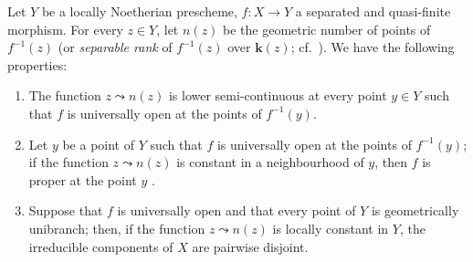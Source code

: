 \begin{proposition}[15.5.1]
\label{IV.15.5.1}
Let $Y$ be a locally Noetherian prescheme, $f:X\to Y$ a separated and quasi-finite morphism.
For every $z\in Y$, let $n(z)$ be the geometric number of points of $f^{-1}(z)$ \textup{(or} \emph{separable rank} \textup{of} $f^{-1}(z)$ \textup{over} $\boldsymbol{k}(z)$\textup{; cf.}\ \textup{)}.
We have the following properties:
\begin{enumerate}[label=(\roman*)]
  \item The function $z\leadsto n(z)$ is lower semi-continuous at every point $y\in Y$ such that $f$ is universally open at the points of $f^{-1}(y)$.
  \item Let $y$ be a point of $Y$ such that $f$ is universally open at the points of $f^{-1}(y)$; if the function $z\leadsto n(z)$ is constant in a neighbourhood of $y$, then $f$ is proper at the point $y$ .
  \item Suppose that $f$ is universally open and that every point of $Y$ is geometrically unibranch; then, if the function $z\leadsto n(z)$ is locally constant in $Y$, the irreducible components of $X$ are pairwise disjoint.
\end{enumerate}
\end{proposition}

